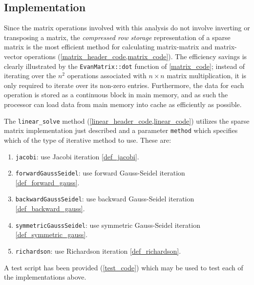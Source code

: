 \documentclass[12pt]{evanarticle}
\begin{document}

\subsection{Implementation} \label{sec_linear_implementation}

Since the matrix operations involved with this analysis do not involve inverting or transposing a matrix, the \emph{compressed row storage} representation of a sparse matrix is the most efficient method for calculating matrix-matrix and matrix-vector operations (\cref{matrix_header_code,matrix_code}).
The efficiency savings is clearly illustrated by the \texttt{EvanMatrix::dot} function of \cref{matrix_code}; instead of iterating over the $n^2$ operations associated with $n \times n$ matrix multiplication, it is only required to iterate over its non-zero entries.
Furthermore, the data for each operation is stored as a continuous block in main memory, and as such the processor can load data from main memory into cache as efficiently as possible.

The \texttt{linear\_solve} method (\cref{linear_header_code,linear_code}) utilizes the sparse matrix implementation just described and a parameter \texttt{method} which specifies which of the type of iterative method to use.
These are:
\begin{enumerate}

	\item \texttt{jacobi}: use Jacobi iteration \cref{def_jacobi}.

	\item \texttt{forwardGaussSeidel}: use forward Gauss-Seidel iteration \cref{def_forward_gauss}.

	\item \texttt{backwardGaussSeidel}: use backward Gauss-Seidel iteration \cref{def_backward_gauss}.

	\item \texttt{symmetricGaussSeidel}: use symmetric Gauss-Seidel iteration \cref{def_symmetric_gauss}.

	\item \texttt{richardson}: use Richardson iteration \cref{def_richardson}.

\end{enumerate}

A test script has been provided (\cref{test_code}) which may be used to test each of the implementations above.
\end{document}
